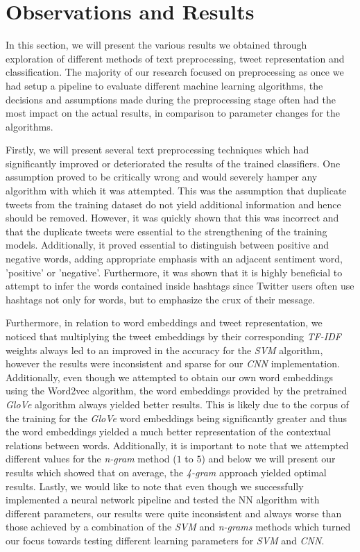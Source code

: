 \documentclass[10pt,conference]{IEEEtran}
\begin{document}
\section{Observations and Results}

In this section, we will present the various results we obtained through exploration of different methods of text preprocessing, tweet representation and classification. The majority of our research focused on preprocessing as once we had setup a pipeline to evaluate different machine learning algorithms, the decisions and assumptions made during the preprocessing stage often had the most impact on the actual results, in comparison to parameter changes for the algorithms.

Firstly, we will present several text preprocessing techniques which had significantly improved or deteriorated the results of the trained classifiers. One assumption proved to be critically wrong and would severely hamper any algorithm with which it was attempted. This was the assumption that duplicate tweets from the training dataset do not yield additional information and hence should be removed. However, it was quickly shown that this was incorrect and that the duplicate tweets were essential to the strengthening of the training models. Additionally, it proved essential to distinguish between positive and negative words, adding appropriate emphasis with an adjacent sentiment word, 'positive' or 'negative'. Furthermore, it was shown that it is highly beneficial to attempt to infer the words contained inside hashtags since Twitter users often use hashtags not only for words, but to emphasize the crux of their message. 

Furthermore, in relation to word embeddings and tweet representation, we noticed that multiplying the tweet embeddings by their corresponding \textit{TF-IDF} weights always led to an improved in the accuracy for the \textit{SVM} algorithm, however the results were inconsistent and sparse for our \textit{CNN} implementation. Additionally, even though we attempted to obtain our own word embeddings using the Word2vec algorithm, the word embeddings provided by the pretrained \textit{GloVe} algorithm always yielded better results. This is likely due to the corpus of the training for the \textit{GloVe} word embeddings being significantly greater and thus the word embeddings yielded a much better representation of the contextual relations between words. Additionally, it is important to note that we attempted different values for the \textit{n-gram} method ($1$ to $5$) and below we will present our results which showed that on average, the \textit{4-gram} approach yielded optimal results. Lastly, we would like to note that even though we successfully implemented a neural network pipeline and tested the NN algorithm with different parameters, our results were quite inconsistent and always worse than those achieved by a combination of the \textit{SVM} and \textit{n-grams} methods which turned our focus towards testing different learning parameters for \textit{SVM} and \textit{CNN}.
\end{document}
